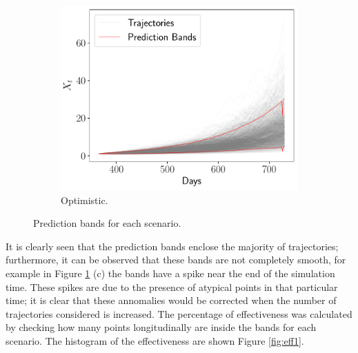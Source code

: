 \documentclass[11pt]{article}
\theoremstyle{definition}
\theoremstyle{remark}
\theoremstyle{remark}
\begin{document}
\begin{figure}[H]
\begin{subfigure}[b]{0.45\textwidth}
      \includegraphics[scale=0.45]{bands_optimistic.pdf}
      \caption{Optimistic.}
  \end{subfigure}
  \caption{Prediction bands for each scenario.}
  \label{fig:pb1}
\end{figure}

It is clearly seen that the prediction bands enclose the majority of
trajectories; furthermore, it can be observed that these bands are not
completely smooth, for example in Figure \ref{fig:pb1} (c) the bands have a
spike near the end of the simulation time. These spikes are due to the presence
of atypical points in that particular time; it is clear that these annomalies
would be corrected when the number of trajectories considered is increased.
The percentage of effectiveness was calculated by checking how
many points longitudinally are inside the bands for each scenario. The
histogram of the effectiveness are shown Figure \ref{fig:eff1}.
\end{document}
